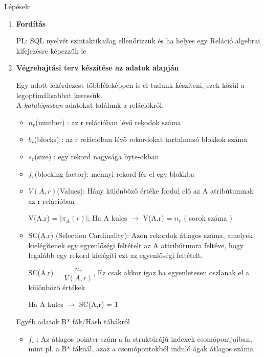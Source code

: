 Lépések:
	\begin{enumerate}
		\item \textbf{Fordítás}

			PL: SQL nyelvét szintaktikailag ellenőrizzük és ha helyes egy Reláció algebrai kifejezésre képezzük le

		\item \textbf{Végrehajtási terv készítése az adatok alapján}

			Egy adott lekérdezést többféleképpen is el tudunk készíteni, ezek közül a legoptimálisabbat keressük.\\[-2pt]

		A \textit{katalógusban} adatokat találunk a relációkról:

				\begin{itemize}
					\item $n_r$(number) : az r relációban lévő rekodok száma

					\item $b_r$(blocks) : az r relációban lévő rekordokat tartalmazó blokkok száma

					\item $s_r$(size) : egy rekord nagysága byte-okban

					\item $f_r$(blocking factor): mennyi rekord fér el egy blokkba

					\item $V(A,r)$(Values): Hány különböző értéke fordul elő az A atribútumnak az r relációban

						 \forceindent V(A,r) = $| \pi_A(r)|$; Ha A kulcs $\rightarrow$ V(A,r) = $n_r$ ( sorok száma )

					\item SC(A,r) (Selection Cardinality): Azon rekordok átlagos száma, amelyek kielégítenek egy egyenlőségi feltételt az A attribútumra feltéve, hogy legalább egy rekord kielégíti ezt az egyenlőségi feltételt.

					\forceindent SC(A,r) = $\dfrac{n_r}{V(A,r)}$, Ez csak akkor igaz ha egyenletesen oszlanak el a különböző értékek

					\forceindent Ha A kulcs $\rightarrow$ SC(A,r) = 1

				\end{itemize}
			Egyéb adatok B* fák/Hash tábákról

				\begin{itemize}
					\item $f_i$ : Az átlagos pointer-szám a fa struktúrájú indexek csomópontjaiban, mint pl. a B* fáknál, azaz a csomópontokból induló ágak átlagos száma


\end{itemize}
\end{enumerate}
